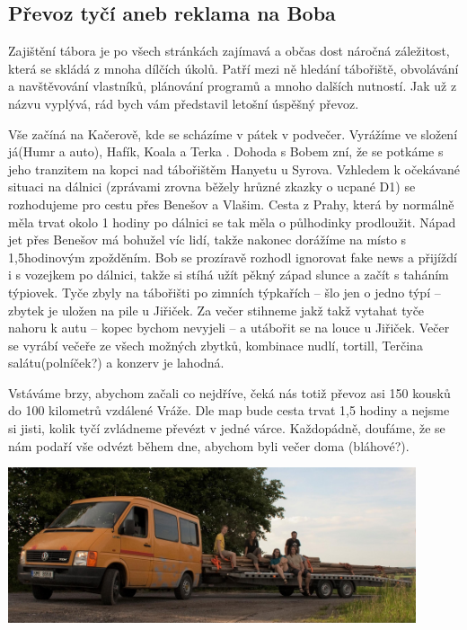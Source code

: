 \subsection*{Převoz tyčí aneb reklama na Boba}
\label{sub:převoz_tyčí_aneb_reklama_na_Boba}

Zajištění tábora je po všech stránkách zajímavá a občas dost náročná záležitost, která se skládá z mnoha dílčích úkolů. Patří mezi ně hledání tábořiště, obvolávání a navštěvování vlastníků, plánování programů a mnoho dalších nutností. Jak už z názvu vyplývá, rád bych vám představil letošní úspěšný převoz.

Vše začíná na Kačerově, kde se scházíme v pátek v podvečer. Vyrážíme ve složení já(Humr a auto), Hafík, Koala a Terka . Dohoda s Bobem zní, že se potkáme s jeho tranzitem na kopci nad tábořištěm Hanyetu u Syrova. Vzhledem k očekávané situaci na dálnici (zprávami zrovna běžely hrůzné zkazky o ucpané D1) se rozhodujeme pro cestu přes Benešov a Vlašim. Cesta z Prahy, která by normálně měla trvat okolo 1 hodiny po dálnici se tak měla o půlhodinky prodloužit. Nápad jet přes Benešov má bohužel víc lidí, takže nakonec dorážíme na místo s 1,5hodinovým zpožděním. Bob se prozíravě rozhodl ignorovat fake news a přijíždí i s vozejkem po dálnici, takže si stíhá užít pěkný západ slunce a začít s taháním týpiovek. Tyče zbyly na tábořišti po zimních týpkařích – šlo jen o jedno týpí – zbytek je uložen na pile u Jiřiček. Za večer stihneme jakž takž vytahat tyče nahoru k autu – kopec bychom nevyjeli – a utábořit se na louce u Jiřiček. Večer se vyrábí večeře ze všech možných zbytků, kombinace nudlí, tortill, Terčina salátu(polníček?) a konzerv je lahodná.

Vstáváme brzy, abychom začali co nejdříve, čeká nás totiž převoz asi 150 kousků do 100 kilometrů vzdálené Vráže. Dle map bude cesta trvat 1,5 hodiny a nejsme si jisti, kolik tyčí zvládneme převézt v jedné várce. Každopádně, doufáme, že se nám podaří vše odvézt během dne, abychom byli večer doma (bláhové?).


\begin{center}

\includegraphics[width=12cm]{img/udo_clanky/Prevoz_tyci_2019_010.jpg}
\end{center}


